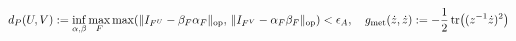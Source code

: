 \documentclass[preview]{standalone}
\begin{document}
\begin{align*}
\special{dvisvgm:raw <g id='unique000'>}d_P(U,V) := \inf_{\alpha,\beta}\max_{F}\max\!\left(\|I_{F^U}-\beta_F\alpha_F\|_{\text{op}},\,\|I_{F^V}-\alpha_F\beta_F\|_{\text{op}}\right) < \epsilon_A, \quad g_{\text{met}}(\dot{z},\dot{z}) := -\frac{1}{2}\operatorname{tr}\!\left((z^{-1}\dot{z})^2\right)\special{dvisvgm:raw </g>}
\end{align*}
\end{document}

